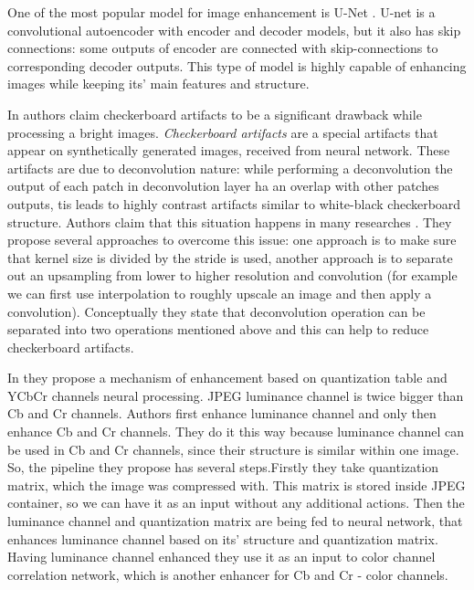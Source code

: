 One of the most popular model for image enhancement is U-Net \cite{ronneberger_u-net_2015}. U-net is a convolutional autoencoder with encoder and decoder models, but it also has skip connections: some outputs of encoder are connected with skip-connections to corresponding decoder outputs. This type of model is highly capable of enhancing images while keeping its' main features and structure.

In \cite{odena_deconvolution_2016} authors claim checkerboard artifacts to be a significant drawback while processing a bright images. \textit{Checkerboard artifacts} are a special artifacts that appear on synthetically generated images, received from neural network. These artifacts are due to deconvolution nature: while performing a deconvolution the output of each patch in deconvolution layer ha an overlap with other patches outputs, tis leads to highly contrast artifacts similar to white-black checkerboard structure. Authors claim that this situation happens in many researches \cite{dumoulin_adversarially_2017,donahue_adversarial_2017,salimans_improved_2016,radford_unsupervised_2016}. They propose several approaches to overcome this issue: one approach is to make sure that kernel size is divided by the stride is used, another approach is to separate out an upsampling from lower to higher resolution and convolution (for example we can first use interpolation to roughly upscale an image and then apply a convolution). Conceptually they state that deconvolution operation can be separated into two operations mentioned above and this can help to reduce checkerboard artifacts.

In \cite{ehrlich_quantization_2020} they propose a mechanism of enhancement based on quantization table and YCbCr channels neural processing. JPEG \cite{JPEG-1992} luminance channel is twice bigger than Cb and Cr channels. Authors first enhance luminance channel and only then enhance Cb and Cr channels. They do it this way because luminance channel can be used in Cb and Cr channels, since their structure is similar within one image. So, the pipeline they propose has several steps.Firstly they take quantization matrix, which the image was compressed with. This matrix is stored inside JPEG container, so we can have it as an input without any additional actions. Then the luminance channel and quantization matrix are being fed to neural network, that enhances luminance channel based on its' structure and quantization matrix. Having luminance channel enhanced they use it as an input to color channel correlation network, which is another enhancer for Cb and Cr - color channels.

